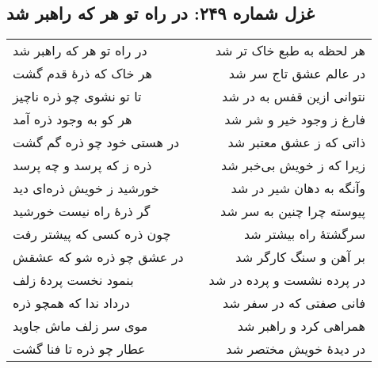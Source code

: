 \begin{center}
\section*{غزل شماره ۲۴۹: در راه تو هر که راهبر شد}
\label{sec:249}
\begin{longtable}{l p{0.5cm} r}
در راه تو هر که راهبر شد
&&
هر لحظه به طبع خاک تر شد
\\
هر خاک که ذرهٔ قدم گشت
&&
در عالم عشق تاج سر شد
\\
تا تو نشوی چو ذره ناچیز
&&
نتوانی ازین قفس به در شد
\\
هر کو به وجود ذره آمد
&&
فارغ ز وجود خیر و شر شد
\\
در هستی خود چو ذره گم گشت
&&
ذاتی که ز عشق معتبر شد
\\
ذره ز که پرسد و چه پرسد
&&
زیرا که ز خویش بی‌خبر شد
\\
خورشید ز خویش ذره‌ای دید
&&
وآنگه به دهان شیر در شد
\\
گر ذرهٔ راه نیست خورشید
&&
پیوسته چرا چنین به سر شد
\\
چون ذره کسی که پیشتر رفت
&&
سرگشتهٔ راه بیشتر شد
\\
در عشق چو ذره شو که عشقش
&&
بر آهن و سنگ کارگر شد
\\
بنمود نخست پردهٔ زلف
&&
در پرده نشست و پرده در شد
\\
درداد ندا که همچو ذره
&&
فانی صفتی که در سفر شد
\\
موی سر زلف ماش جاوید
&&
همراهی کرد و راهبر شد
\\
عطار چو ذره تا فنا گشت
&&
در دیدهٔ خویش مختصر شد
\\
\end{longtable}
\end{center}

